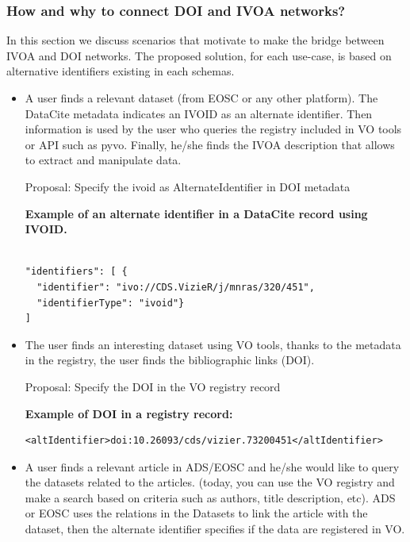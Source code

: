 \documentclass[11pt,a4paper]{ivoa}
\begin{document}
\subsubsection{How and why to connect DOI and IVOA networks?} \hypertarget{how-and-why-to-connect-doi-and-ivoa-networks-how-and-why-to-connect-doi-and-ivoa-networks}{}\label{sec:how-and-why-to-connect-doi-and-ivoa-networks-how-and-why-to-connect-doi-and-ivoa-networks}

In this section we discuss scenarios that motivate to make the bridge between IVOA and DOI networks.\newline
The proposed solution, for each use-case, is based on alternative identifiers existing in each schemas.

\begin{itemize}
\item{} A user finds a relevant dataset (from EOSC or any other platform). The DataCite metadata indicates an IVOID as an alternate identifier. Then information is used by the user who queries the registry included in VO tools or API such as pyvo. Finally, he/she finds the IVOA description that allows to extract and manipulate data.


Proposal: Specify the ivoid as AlternateIdentifier in DOI metadata

\textbf{Example of an alternate identifier in a DataCite record using IVOID.}
\begin{lstlisting}
  
"identifiers": [ {
  "identifier": "ivo://CDS.VizieR/j/mnras/320/451",
  "identifierType": "ivoid"}
]
\end{lstlisting}

\item{} The user finds an interesting dataset using VO tools, thanks to the metadata in the registry, the user finds the bibliographic links (DOI).

Proposal: Specify the DOI in the VO registry record

\textbf{Example of DOI in a registry record:}

\begin{lstlisting}
<altIdentifier>doi:10.26093/cds/vizier.73200451</altIdentifier>
\end{lstlisting}

\item{} A user finds a relevant article in ADS/EOSC and he/she would like to query the datasets related to the articles. (today, you can use the VO registry and make a search based on criteria such as authors, title description, etc). ADS  or EOSC uses the relations in the Datasets to link the article with the dataset, then the alternate identifier specifies if the data are registered in VO.
\end{itemize}
\end{document}
